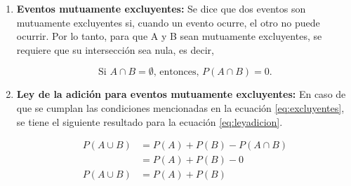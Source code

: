 \documentclass[
  11pt,
]{book}
\theoremstyle{definition}
\theoremstyle{definition}
\newtheorem{example}{Ejemplo}[chapter]
\theoremstyle{definition}
\theoremstyle{definition}
\theoremstyle{remark}
\begin{document}
\begin{enumerate}
  \begin{example}
  Considere un estudio reciente efectuado por el director de personal de una empresa de software. En el estudio encontró que el 30\% de los empleados que se van de la empresa antes de dos años, lo hacen por estar insatisfechos con el salario, 20\% se van de la empresa por estar descontentos con el trabajo y 12\% por estar insatisfechos con las dos cosas, el salio y el trabajo. ¿Cuál es la probabilidad de que un empleado que se vaya de la empresa en menos de dos años lo haga por estar insatisfecho con el salario, con el trabajo o con las dos cosas?

  Sea

  \begin{equation}
  \notag
  \begin{split}
  S &: \text{El empleado se va de la empresa por insatisfacción con el salario}\\
  W &: \text{El empleado se va de la empresa por insatisfacción con el trabajo}\\
  \end{split}
  \end{equation}

  Se tiene \(P(S) = 0.3\), \(P(W) = 0.2\) y \(P(S\cap W) = 0.12\). Al aplicar la ecuación \eqref{eq:leyadicion}, de la ley de la adición, se tiene

  \[P(S\cup W) = P(S) + P(W) - P(S\cap W) = 0.3+0.2-0.12 = 0.38\]
  Así, la probabilidad de que un empleado se vaya de la empresa por el salario o por el trabajo es 0.38.
  \end{example}
\item
  \textbf{Eventos mutuamente excluyentes:} Se dice que dos eventos son mutuamente excluyentes si, cuando un evento ocurre, el otro no puede ocurrir. Por lo tanto, para que A y B sean mutuamente excluyentes, se requiere que su intersección sea nula, es decir,

  \begin{equation}
  \text{Si } A \cap B = \emptyset \text{, entonces, } P(A \cap B) = 0.
  \label{eq:excluyentes}
  \end{equation}
\item
  \textbf{Ley de la adición para eventos mutuamente excluyentes:} En caso de que se cumplan las condiciones mencionadas en la ecuación \eqref{eq:excluyentes}, se tiene el siguiente resultado para la ecuación \eqref{eq:leyadicion}.

  \begin{equation}
  \begin{split}
  P(A\cup B) &= P(A) + P(B) - P(A\cap B)\\
  &= P(A) + P(B) - 0\\
  P(A\cup B) &= P(A) + P(B)\\
  \end{split}
  \label{eq:leyadicion2}
  \end{equation}


\end{enumerate}
\end{document}
